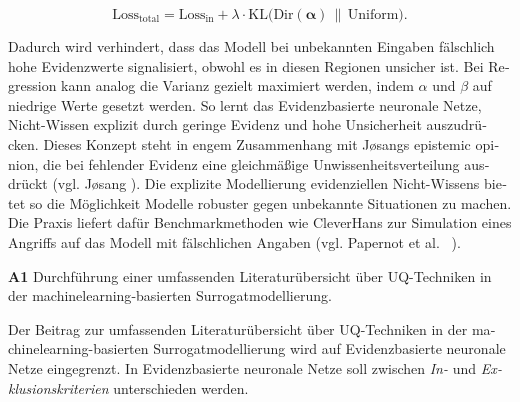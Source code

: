 \begin{otherlanguage}{ngerman}
\begin{equation}
\text{Loss}_{\text{total}} 
= \text{Loss}_{\text{in}} 
+ \lambda \cdot \text{KL}\bigl(\text{Dir}(\boldsymbol{\alpha}) \,\|\, \text{Uniform}\bigr).
\end{equation}

Dadurch wird verhindert, dass das Modell bei unbekannten Eingaben fälschlich hohe Evidenzwerte signalisiert, obwohl es in diesen Regionen unsicher ist. Bei Regression kann analog die Varianz gezielt maximiert werden, indem \(\alpha\) und \(\beta\) auf niedrige Werte gesetzt werden. So lernt das \gls{Evidenzbasierte neuronale Netze}, Nicht-Wissen explizit durch geringe Evidenz und hohe Unsicherheit auszudrücken. Dieses Konzept steht in engem Zusammenhang mit Jøsangs \glqq{}epistemic opinion\grqq{}, die bei fehlender Evidenz eine gleichmäßige Unwissenheitsverteilung ausdrückt (vgl. Jøsang \parencite[S. 22]{josang2016subjective}). Die explizite Modellierung evidenziellen Nicht-Wissens bietet so die Möglichkeit Modelle robuster gegen unbekannte Situationen zu machen. Die Praxis liefert dafür Benchmarkmethoden wie CleverHans zur Simulation eines \glqq{}Angriffs\grqq{} auf das Modell mit fälschlichen Angaben (vgl. Papernot et al. ~\parencite{papernot2016cleverhans}).




\pagebreak


\textbf{A1} Durchführung einer umfassenden Literaturübersicht über UQ-Techniken in der \gls{machinelearning}-basierten Surrogatmodellierung.
\par\vspace{1\baselineskip}\noindent

Der Beitrag zur umfassenden Literaturübersicht über UQ-Techniken in der \gls{machinelearning}-basierten Surrogatmodellierung wird auf \gls{Evidenzbasierte neuronale Netze} eingegrenzt. In \gls{Evidenzbasierte neuronale Netze} soll zwischen \textit{In-} und \textit{Exklusionskriterien} unterschieden werden.


\end{otherlanguage}
